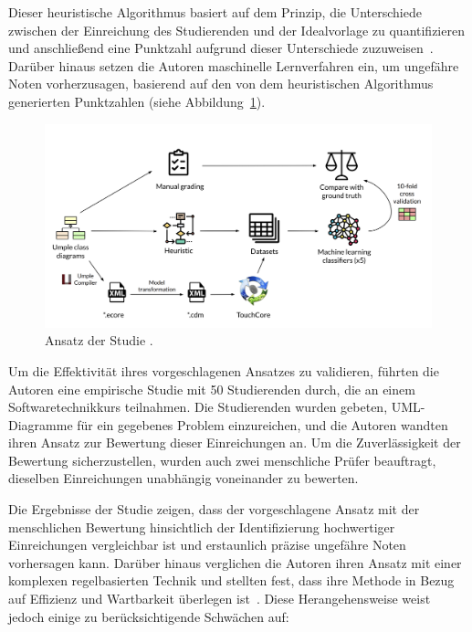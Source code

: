 Dieser heuristische Algorithmus basiert auf dem Prinzip, die Unterschiede zwischen der Einreichung des Studierenden und der
Idealvorlage zu quantifizieren und anschließend eine Punktzahl aufgrund dieser Unterschiede zuzuweisen~\cite{huyck1993efficient}.
Darüber hinaus setzen die Autoren maschinelle Lernverfahren ein, um ungefähre Noten vorherzusagen, basierend auf den von
dem heuristischen Algorithmus generierten Punktzahlen (siehe Abbildung~\ref{fig:ml-approach}).

\begin{figure}
	\centering
	\includegraphics[width=14cm]{images/ml-approach}
	\caption{Ansatz der Studie \cite{boubekeur2020automatic}.}
	\label{fig:ml-approach}
\end{figure}

Um die Effektivität ihres vorgeschlagenen Ansatzes zu validieren, führten die Autoren eine empirische Studie mit 50
Studierenden durch, die an einem Softwaretechnikkurs teilnahmen. Die Studierenden wurden gebeten, UML-Diagramme für ein
gegebenes Problem einzureichen, und die Autoren wandten ihren Ansatz zur Bewertung dieser Einreichungen an.
Um die Zuverlässigkeit der Bewertung sicherzustellen, wurden auch zwei menschliche Prüfer beauftragt, dieselben
Einreichungen unabhängig voneinander zu bewerten.

Die Ergebnisse der Studie zeigen, dass der vorgeschlagene Ansatz mit der menschlichen Bewertung hinsichtlich der
Identifizierung hochwertiger Einreichungen vergleichbar ist und erstaunlich präzise ungefähre Noten vorhersagen kann.
Darüber hinaus verglichen die Autoren ihren Ansatz mit einer komplexen regelbasierten Technik und stellten fest, dass
ihre Methode in Bezug auf Effizienz und Wartbarkeit überlegen ist~\cite{boubekeur2020automatic}. Diese Herangehensweise
weist jedoch einige zu berücksichtigende Schwächen auf:

